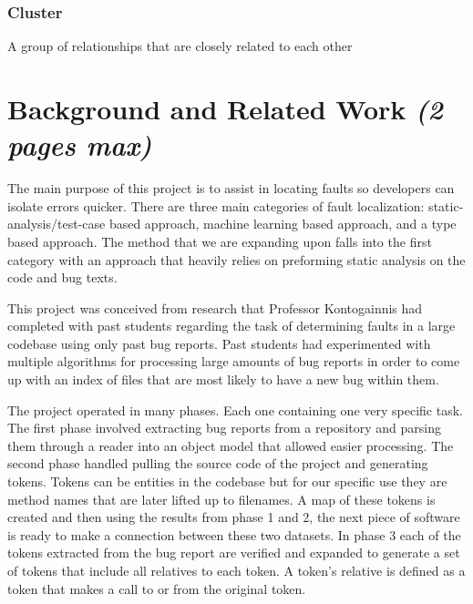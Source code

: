 \documentclass[12pt]{article}
\begin{document}
\hypertarget{cluster}{%
\subsubsection{Cluster}\label{cluster}}

A group of relationships that are closely related to each other

\hypertarget{background-and-related-work-2-pages-max}{%
\section{\texorpdfstring{Background and Related Work \emph{(2 pages
max)}}{Background and Related Work (2 pages max)}}\label{background-and-related-work-2-pages-max}}

The main purpose of this project is to assist in locating faults so
developers can isolate errors quicker. There are three main categories
of fault localization: static-analysis/test-case based approach, machine
learning based approach, and a type based approach. The method that we
are expanding upon falls into the first category with an approach that
heavily relies on preforming static analysis on the code and bug texts.

This project was conceived from research that Professor Kontogainnis had
completed with past students regarding the task of determining faults in
a large codebase using only past bug reports. Past students had
experimented with multiple algorithms for processing large amounts of
bug reports in order to come up with an index of files that are most
likely to have a new bug within them.

The project operated in many phases. Each one containing one very
specific task. The first phase involved extracting bug reports from a
repository and parsing them through a reader into an object model that
allowed easier processing. The second phase handled pulling the source
code of the project and generating tokens. Tokens can be entities in the
codebase but for our specific use they are method names that are later
lifted up to filenames. A map of these tokens is created and then using
the results from phase 1 and 2, the next piece of software is ready to
make a connection between these two datasets. In phase 3 each of the
tokens extracted from the bug report are verified and expanded to
generate a set of tokens that include all relatives to each token. A
token's relative is defined as a token that makes a call to or from the
original token.
\end{document}
